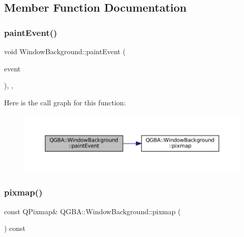 \subsection{Member Function Documentation}
\mbox{\label{class_q_g_b_a_1_1_window_background_acb7588a6944460adab62af3935ef5ab4}} 
\subsubsection{\texorpdfstring{paint\+Event()}{paintEvent()}}
{\footnotesize\ttfamily void Window\+Background\+::paint\+Event (\begin{DoxyParamCaption}\item[{Q\+Paint\+Event $\ast$}]{event }\end{DoxyParamCaption})\hspace{0.3cm}{\ttfamily [override]}, {\ttfamily [protected]}, {\ttfamily [virtual]}}

Here is the call graph for this function\+:
\nopagebreak
\begin{figure}[H]
\begin{center}
\leavevmode
\includegraphics[width=350pt]{class_q_g_b_a_1_1_window_background_acb7588a6944460adab62af3935ef5ab4_cgraph}
\end{center}
\end{figure}
\mbox{\label{class_q_g_b_a_1_1_window_background_a6d7ad776b592f3fde80b38238c582635}} 
\subsubsection{\texorpdfstring{pixmap()}{pixmap()}}
{\footnotesize\ttfamily const Q\+Pixmap\& Q\+G\+B\+A\+::\+Window\+Background\+::pixmap (\begin{DoxyParamCaption}{ }\end{DoxyParamCaption}) const\hspace{0.3cm}{\ttfamily [inline]}}

